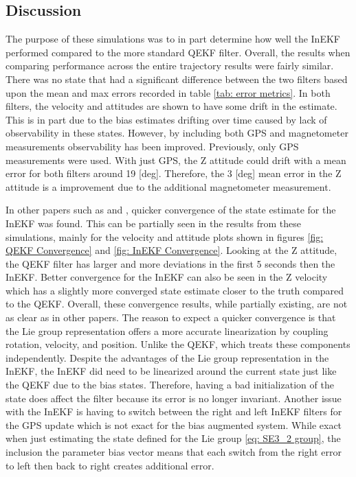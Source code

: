 \subsection{Discussion}
The purpose of these simulations was to in part determine how well the InEKF performed compared to the more standard QEKF filter. Overall, the results when comparing performance across the entire trajectory results were fairly similar. There was no state that had a significant difference between the two filters based upon the mean and max errors recorded in table \eqref{tab: error metrics}. In both filters, the velocity and attitudes are shown to have some drift in the estimate. This is in part due to the bias estimates drifting over time caused by lack of observability in these states. However, by including both GPS and magnetometer measurements observability has been improved. Previously, only GPS measurements were used. With just GPS, the Z attitude could drift with a mean error for both filters around 19 [deg]. Therefore, the 3 [deg] mean error in the Z attitude is a improvement due to the additional magnetometer measurement.

In other papers such as \cite{Contact-Aided_Invarant_EKF} and \cite{9444664}, quicker convergence of the state estimate for the InEKF was found. This can be partially seen in the results from these simulations, mainly for the velocity and attitude plots shown in figures \eqref{fig: QEKF Convergence} and \eqref{fig: InEKF Convergence}. Looking at the Z attitude, the QEKF filter has larger and more deviations in the first 5 seconds then the InEKF. Better convergence for the InEKF can also be seen in the Z velocity which has a slightly more converged state estimate closer to the truth compared to the QEKF. Overall, these convergence results, while partially existing, are not as clear as in other papers. The reason to expect a quicker convergence is that the Lie group representation offers a more accurate linearization by coupling rotation, velocity, and position. Unlike the QEKF, which treats these components independently. Despite the advantages of the Lie group representation in the InEKF, the InEKF did need to be linearized around the current state just like the QEKF due to the bias states. Therefore, having a bad initialization of the state does affect the filter because its error is no longer invariant. Another issue with the InEKF is having to switch between the right and left InEKF filters for the GPS update which is not exact for the bias augmented system. While exact when just estimating the state defined for the Lie group \eqref{eq: SE3_2 group}, the inclusion the parameter bias vector means that each switch from the right error to left then back to right creates additional error. 
 

